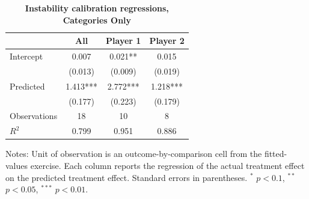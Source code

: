 \begin{table}[!htbp]
\centering
\caption{\textbf{Instability calibration regressions, Categories Only}}
\label{tab:cats_only_instability_regs}
\begin{tabular}{lccc}
\toprule
& All & Player 1 & Player 2 \\
\midrule
Intercept & 0.007 & 0.021** & 0.015 \\
& (0.013) & (0.009) & (0.019) \\
Predicted & 1.413*** & 2.772*** & 1.218*** \\
& (0.177) & (0.223) & (0.179) \\
Observations & 18 & 10 & 8 \\
$R^2$ & 0.799 & 0.951 & 0.886 \\
\bottomrule
\end{tabular}

\vspace{0.2cm}
\begin{minipage}{0.9\textwidth}
\footnotesize Notes: Unit of observation is an outcome-by-comparison cell from the fitted-values exercise. Each column reports the regression of the actual treatment effect on the predicted treatment effect. Standard errors in parentheses. $^*$ $p<0.1$, $^{**}$ $p<0.05$, $^{***}$ $p<0.01$.
\end{minipage}
\end{table}
